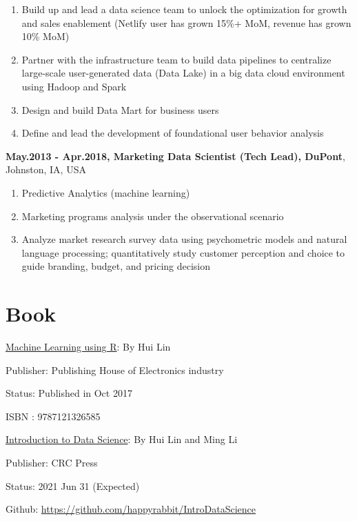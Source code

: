 \documentclass[11pt,]{article}
\providecommand{\tightlist}{%
  \setlength{\itemsep}{0pt}\setlength{\parskip}{0pt}}
\renewenvironment{itemize}{
  \begin{list}{}{
    \setlength{\leftmargin}{1.5em}
  }
}{
  \end{list}
}
\begin{document}
\begin{itemize}
  \begin{enumerate}
  \def\labelenumi{\arabic{enumi}.}
  \tightlist
  \item
    Build up and lead a data science team to unlock the optimization for
    growth and sales enablement (Netlify user has grown 15\%+ MoM,
    revenue has grown 10\% MoM)
  \item
    Partner with the infrastructure team to build data pipelines to
    centralize large-scale user-generated data (Data Lake) in a big data
    cloud environment using Hadoop and Spark
  \item
    Design and build Data Mart for business users
  \item
    Define and lead the development of foundational user behavior
    analysis
  \end{enumerate}
\item
  \textbf{May.2013 - Apr.2018, Marketing Data Scientist (Tech Lead),
  DuPont}, Johnston, IA, USA

  \begin{enumerate}
  \def\labelenumi{\arabic{enumi}.}
  \tightlist
  \item
    Predictive Analytics (machine learning)
  \item
    Marketing programs analysis under the observational scenario
  \item
    Analyze market research survey data using psychometric models and
    natural language processing; quantitatively study customer
    perception and choice to guide branding, budget, and pricing
    decision
  \end{enumerate}
\end{itemize}

\hypertarget{book}{%
\section{Book}\label{book}}

\begin{itemize}
\tightlist
\item
  \href{http://scientistcafe.com/book/}{Machine Learning using R}: By
  Hui Lin

  \begin{itemize}
  \tightlist
  \item
    Publisher: Publishing House of Electronics industry
  \item
    Status: Published in Oct 2017
  \item
    ISBN : 9787121326585
  \end{itemize}
\item
  \href{http://scientistcafe.com/IDS}{Introduction to Data Science}: By
  Hui Lin and Ming Li

  \begin{itemize}
  \tightlist
  \item
    Publisher: CRC Press
  \item
    Status: 2021 Jun 31 (Expected)
  \item
    Github: \url{https://github.com/happyrabbit/IntroDataScience}
  \end{itemize}
\end{itemize}
\end{document}
